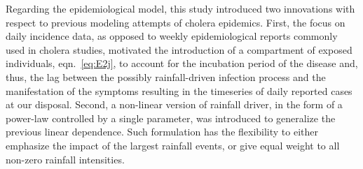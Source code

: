 Regarding the epidemiological model, this study introduced two innovations with respect to previous modeling attempts of cholera epidemics\cite{Bertuzzo:ProbabilityExtinctionHaiti:2016,Pasetto:RealtimeProjectionsCholera:2017}. First, the focus on daily incidence data, as opposed to weekly epidemiological reports commonly used in cholera studies, motivated the introduction of a compartment of exposed individuals, eqn.~\eqref{eq:E2j}, to account for the incubation period of the disease and, thus, the lag between the possibly rainfall-driven infection process and the manifestation of the symptoms resulting in the timeseries of daily reported cases at our disposal. %
Second, a non-linear version of rainfall driver, in the form of a power-law controlled by a single parameter, was introduced to generalize the previous linear dependence. Such formulation has the flexibility to either emphasize the impact of the largest rainfall events, or give equal weight to all non-zero rainfall intensities. %

